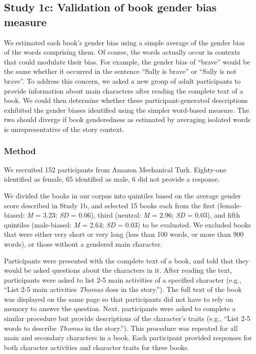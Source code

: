 \documentclass[
  english,
  ,man,floatsintext]{apa6}
\begin{document}
\hypertarget{study-1c-validation-of-book-gender-bias-measure}{%
\subsection{Study 1c: Validation of book gender bias measure}\label{study-1c-validation-of-book-gender-bias-measure}}

We estimated each book's gender bias using a simple average of the gender bias of the words comprising them. Of course, the words actually occur in contexts that could modulate their bias. For example, the gender bias of \enquote{brave} would be the same whether it occurred in the sentence \enquote{Sally is brave} or \enquote{Sally is not brave}. To address this concern, we asked a new group of adult participants to provide information about main characters after reading the complete text of a book. We could then determine whether these participant-generated descriptions exhibited the gender biases identified using the simpler word-based measure. The two should diverge if book genderedness as estimated by averaging isolated words is unrepresentative of the story context.

\hypertarget{method-2}{%
\subsubsection{Method}\label{method-2}}

We recruited 152 participants from Amazon Mechanical Turk. Eighty-one identified as female, 65 identified as male, 6 did not provide a response.

We divided the books in our corpus into quintiles based on the average gender score described in Study 1b, and selected 15 books each from the first (female-biased: \emph{M} = 3.23; \emph{SD} = 0.06), third (neutral: \emph{M} = 2.96; \emph{SD} = 0.03), and fifth quintiles (male-biased: \emph{M} = 2.64; \emph{SD} = 0.03) to be evaluated. We excluded books that were either very short or very long (less than 100 words, or more than 900 words), or those without a gendered main character.

Participants were presented with the complete text of a book, and told that they would be asked questions about the characters in it. After reading the text, participants were asked to list 2-5 main activities of a specified character (e.g., \enquote{List 2-5 main activities \emph{Thomas} does in the story.}). The full text of the book was displayed on the same page so that participants did not have to rely on memory to answer the question. Next, participants were asked to complete a similar procedure but provide descriptions of the character's traits (e.g., \enquote{List 2-5 words to describe \emph{Thomas} in the story.}). This procedure was repeated for all main and secondary characters in a book. Each participant provided responses for both character activities and character traits for three books.
\end{document}
